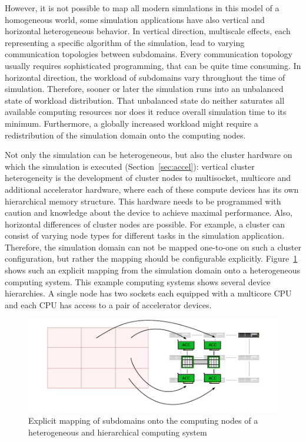 However, it is not possible to map all modern simulations in this
model of a homogeneous world, some simulation applications have also
vertical and horizontal heterogeneous behavior.  In vertical
direction, multiscale effects, each representing a specific algorithm
of the simulation, lead to varying communication topologies between
subdomains. Every communication topology usually requires
sophisticated programming, that can be quite time consuming.  In
horizontal direction, the workload of subdomains vary throughout the
time of simulation. Therefore, sooner or later the simulation runs
into an unbalanced state of workload distribution. That unbalanced
state do neither saturates all available computing resources nor does it
reduce overall simulation time to its minimum. Furthermore, a globally
increased workload might require a redistribution of the simulation
domain onto the computing nodes.

Not only the simulation can be heterogeneous, but also the cluster
hardware on which the simulation is executed
(Section~\ref{sec:accel}): vertical cluster heterogeneity is the
development of cluster nodes to multisocket, multicore and
additional accelerator hardware, where each of these compute devices
has its own hierarchical memory structure. This hardware needs to be
programmed with caution and knowledge about the device to achieve
maximal performance.  Also, horizontal differences of cluster nodes
are possible. For example, a cluster can consist of varying node
types for different tasks in the simulation application. Therefore,
the simulation domain can not be mapped one-to-one on such a cluster
configuration, but rather the mapping should be configurable
explicitly. Figure~\ref{fig:heterogeneous_cluster_node} shows such
an explicit mapping from the simulation domain onto a heterogeneous
computing system. This example computing systems shows several device
hierarchies. A single node has two sockets each equipped with a
multicore CPU and each CPU has access to a pair of accelerator
devices.

\begin{figure}[H]
  \centering
  \includegraphics[width=\textwidth]{graphics/30_heterogeneous_cluster_node}
  \caption{Explicit mapping of subdomains onto the computing nodes of
    a heterogeneous and hierarchical computing system}
  \label{fig:heterogeneous_cluster_node}
\end{figure}

